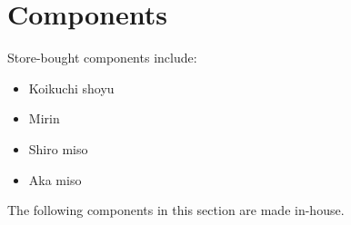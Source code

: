 \documentclass[main]{subfiles}
\begin{document}
\section{Components}

Store-bought components include:

\begin{itemize}
    \item Koikuchi shoyu
    \item Mirin
    \item Shiro miso
    \item Aka miso
\end{itemize}

The following components in this section are made in-house.

\secttoc

\newpage


\newpage




\newpage


\newpage

\newpage

\newpage

\end{document}
